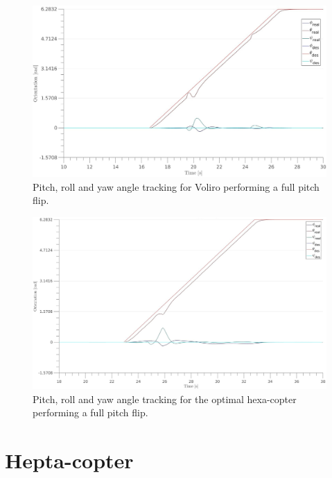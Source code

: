 \begin{figure}[!ht]
  \begin{center}
    \includegraphics[width=1.0\linewidth]{images/Voliro_pitch_angle.jpg}
    \caption{Pitch, roll and yaw angle tracking for Voliro performing a full pitch flip.}
    \label{fig:Voliro_angle_pitch}
  \end{center}
\end{figure}

\begin{figure}[!ht]
  \begin{center}
    \includegraphics[width=1.0\linewidth]{images/Hexa_pitch_angle.jpg}
    \caption{Pitch, roll and yaw angle tracking for the optimal hexa-copter performing a full pitch flip.}
    \label{fig:Hexa_angle_pitch}
  \end{center}
\end{figure}

\clearpage

\section{Hepta-copter}
\label{sec:hepta_copter_sim}


